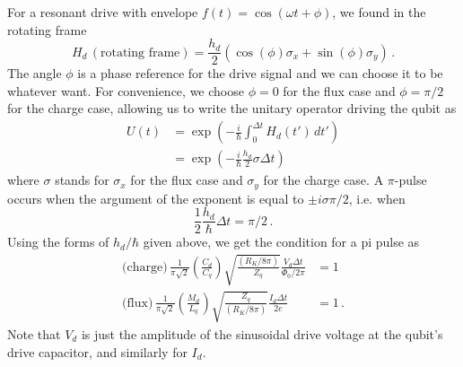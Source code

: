 For a resonant drive with envelope $f(t) = \cos(\omega t + \phi)$, we found in the rotating frame
\begin{equation*}
  H_d \, (\text{rotating frame}) = \frac{h_d}{2} \left( \cos(\phi) \sigma_x + \sin(\phi) \sigma_y \right) \, .
\end{equation*}
The angle $\phi$ is a phase reference for the drive signal and we can choose it to be whatever want.
For convenience, we choose $\phi=0$ for the flux case and $\phi=\pi/2$ for the charge case, allowing us to write the unitary operator driving the qubit as
\begin{align*}
  U(t)
  &= \exp \left( -\frac{i}{\hbar} \int_0^{\Delta t} H_d(t') \, dt' \right) \\
  &= \exp \left( -\frac{i}{\hbar} \frac{h_d}{2} \sigma \Delta t \right)
\end{align*}
where $\sigma$ stands for $\sigma_x$ for the flux case and $\sigma_y$ for the charge case.
A $\pi$-pulse occurs when the argument of the exponent is equal to $\pm i \sigma \pi / 2$, i.e. when
\begin{equation*}
  \frac{1}{2} \frac{h_d}{\hbar} \Delta t = \pi / 2 \, .
\end{equation*}
Using the forms of $h_d/\hbar$ given above, we get the condition for a pi pulse as
\begin{align*}
  \text{(charge)} \, \frac{1}{\pi\sqrt{2}} \left( \frac{C_d}{C_q} \right) \sqrt{\frac{(R_K/8\pi)}{Z_q}} \frac{V_d \Delta t}{\Phi_0/2\pi} &= 1 \\
  \text{(flux)} \, \frac{1}{\pi\sqrt{2}} \left( \frac{M_d}{L_q} \right) \sqrt{\frac{Z_q}{(R_K/8\pi)}} \frac{I_d \Delta t}{2e} &= 1 \, .
\end{align*}
Note that $V_d$ is just the amplitude of the sinusoidal drive voltage at the qubit's drive capacitor, and similarly for $I_d$.


